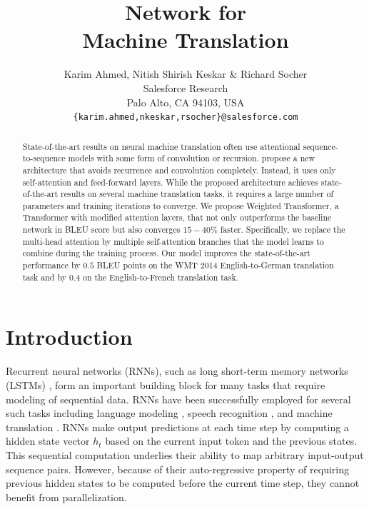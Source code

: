 \documentclass{article} %
\title{\name Network for \\ Machine Translation}
\author{Karim Ahmed, Nitish Shirish Keskar \& Richard Socher \\
Salesforce Research \\
Palo Alto, CA 94103, USA\\
\texttt{\{karim.ahmed,nkeskar,rsocher\}@salesforce.com} \\
}
\newcommand{\name}{Weighted Transformer\xspace}
\begin{document}
\maketitle

\begin{abstract}
State-of-the-art results on neural machine translation often use attentional sequence-to-sequence models with some form of convolution or recursion. \citet{vaswani2017attention} propose a new architecture that avoids recurrence and convolution completely. Instead, it uses only self-attention and feed-forward layers. While the proposed architecture achieves state-of-the-art results on several machine translation tasks, it requires a large number of parameters and training iterations to converge. We propose \name, a Transformer with modified attention layers, that not only outperforms the baseline network in BLEU score but also converges $15-40\%$ faster. 
Specifically, we replace the multi-head attention by multiple self-attention branches that the model learns to combine during the training process. 
Our model improves the state-of-the-art performance by $0.5$ BLEU points on the WMT 2014 English-to-German translation task and by $0.4$ on the English-to-French translation task. %
\end{abstract}

\section{Introduction}
Recurrent neural networks (RNNs), such as long short-term memory networks (LSTMs) \citep{hochreiter1997long}, form an important building block for many tasks that require modeling of sequential data. RNNs have been successfully employed for several such tasks including language modeling \citep{melis2017state,merity2017regularizing}, speech recognition \citep{xiong2017microsoft,graves2013speech}, and machine translation \citep{wu2016google,bahdanau2014neural}. RNNs make output predictions at each time step by computing a hidden state vector $h_t$ based on the current input token and the previous states. This sequential computation underlies their ability to map arbitrary input-output sequence pairs. However, because of their auto-regressive property of requiring previous hidden states to be computed before the current time step, they cannot benefit from parallelization.
\end{document}
